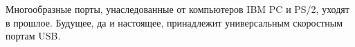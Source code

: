 \secdown

Многообразные порты, унаследованные от компьютеров IBM PC и PS/2, уходят в
прошлое. Будущее, да и настоящее, принадлежит универсальным скоростным портам
USB. 



\secup

